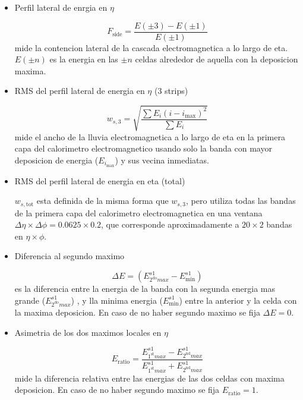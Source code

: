 \begin{itemize}\itemsep0.2cm\parskip0.2cm
\item Perfil lateral de enrgia en $\eta$

  \begin{equation}
    F_\mathrm{side} = \frac{E(\pm 3) - E(\pm 1)}{E(\pm 1)}
  \end{equation}
  mide la contencion lateral de la cascada electromagnetica a lo largo de eta.
  $E(\pm n)$ es la energia en las $\pm n$ celdas alrededor de aquella con la deposicion maxima.

\item RMS del perfil lateral de energia en $\eta$ (3 strips)

  \begin{equation}
    w_{s,3} = \sqrt{ \frac{\sum E_i (i - i_\mathrm{max})^2}{\sum E_i} }
  \end{equation}
  mide el ancho de la lluvia electromagnetica a lo largo de eta en la primera capa
  del calorimetro electromagnetico usando solo la banda con mayor deposicion de energia ($E_{i_\mathrm{max}}$)
  y sus vecina inmediatas.

\item RMS del perfil lateral de energia en eta (total)

  $w_{s,\mathrm{tot}}$ esta definida de la misma forma que $w_{s,3}$, pero utiliza todas las bandas de la
  primera capa del calorimetro electromagnetica en una ventana $\Delta\eta \times \Delta\phi = 0.0625 \times 0.2$,
  que corresponde aproximadamente a $20 \times 2$ bandas en $\eta \times \phi$.

\item Diferencia al segundo maximo

  \begin{equation}
    \Delta E = (E^{s1}_{2^{\mathrm{do}} max} - E_\mathrm{min}^{s1} )
  \end{equation}
  es la diferencia entre la energia de la banda con la segunda energia mas grande ($E^{s1}_{2^{\mathrm{do}} max}$)
  , y lla minima energia ($E_\mathrm{min}^{s1}$) entre la anterior y la celda con la maxima deposicion. En caso
  de no haber segundo maximo se fija $\Delta E = 0$.

\item Asimetria de los dos maximos locales en $\eta$

  \begin{equation}
    E_\mathrm{ratio} = \frac{ E^{s1}_{1^{\mathrm{st}} max} - E^{s1}_{2^{\mathrm{nd}} max} }{ E^{s1}_{1^{\mathrm{st}} max} + E^{s1}_{2^{\mathrm{nd}} max} }
  \end{equation}
  mide la diferencia relativa entre las energias de las dos celdas con maxima deposicion. En caso de no haber segundo maximo
  se fija $E_\mathrm{ratio} = 1$.

\end{itemize}




